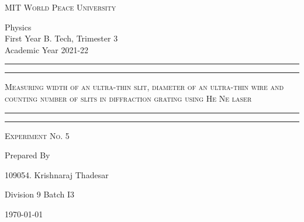 \documentclass[11pt]{article}
\begin{document}
	
	\begin{titlepage} 
		\centering 
		
		
		\huge\textsc{
			MIT World Peace University
		}\\
	
		\vspace{0.75\baselineskip} %
		
		\LARGE{
			Physics\\
			First Year B. Tech, Trimester 3\\
			Academic Year 2021-22
		}
		
		\vfill %
		
		
		\rule{\textwidth}{1.6pt}\vspace*{-\baselineskip}\vspace*{2pt}
		\rule{\textwidth}{0.6pt}
		\vspace{0.75\baselineskip} %
		
		
		
		\huge{\textsc{
			Measuring width of an ultra-thin
			slit, diameter of an ultra-thin wire and counting number of slits in diffraction
			grating using He Ne laser
			}} \\
		
		
		
		\vspace{0.5\baselineskip} %
		\rule{\textwidth}{0.6pt}\vspace*{-\baselineskip}\vspace*{2.8pt}
		\rule{\textwidth}{1.6pt}
		
		\vspace{1\baselineskip} %

			
		\LARGE\textsc{
			Experiment No. 5
		} %
		\vfill
		
		
		Prepared By
		\vspace{0.5\baselineskip} %
		
		\Large{
			109054. Krishnaraj Thadesar
			
			Division 9 Batch I3
		}
		
		
		\vspace{0.5\baselineskip} %
		\today

	\end{titlepage}
\end{document}
